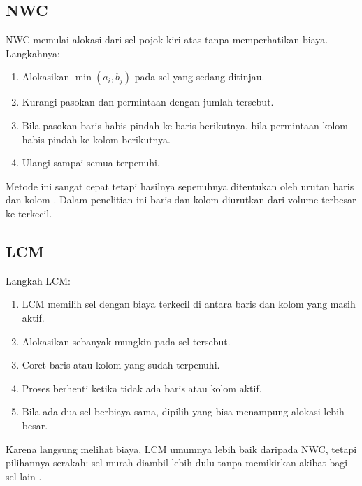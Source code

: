 \documentclass[a4paper,11pt]{article}
\begin{document}
\subsection{NWC}
NWC memulai alokasi dari sel pojok kiri atas tanpa memperhatikan biaya. Langkahnya:
\begin{enumerate}
  \item Alokasikan $\min(a_i,b_j)$ pada sel yang sedang ditinjau.
  \item Kurangi pasokan dan permintaan dengan jumlah tersebut.
  \item Bila pasokan baris habis pindah ke baris berikutnya, bila permintaan kolom habis pindah ke kolom berikutnya.
  \item Ulangi sampai semua terpenuhi.
\end{enumerate}
Metode ini sangat cepat tetapi hasilnya sepenuhnya ditentukan oleh urutan baris dan kolom \cite{harrath2018,karagul2020}. Dalam penelitian ini baris dan kolom diurutkan dari volume terbesar ke terkecil.

\subsection{LCM}
Langkah LCM:
\begin{enumerate}
  \item LCM memilih sel dengan biaya terkecil di antara baris dan kolom yang masih aktif.
  \item Alokasikan sebanyak mungkin pada sel tersebut.
  \item Coret baris atau kolom yang sudah terpenuhi.
  \item Proses berhenti ketika tidak ada baris atau kolom aktif.
  \item Bila ada dua sel berbiaya sama, dipilih yang bisa menampung alokasi lebih besar.
\end{enumerate}
Karena langsung melihat biaya, LCM umumnya lebih baik daripada NWC, tetapi pilihannya serakah: sel murah diambil lebih dulu tanpa memikirkan akibat bagi sel lain \cite{amaliah2022b,karagul2020}.
\end{document}
